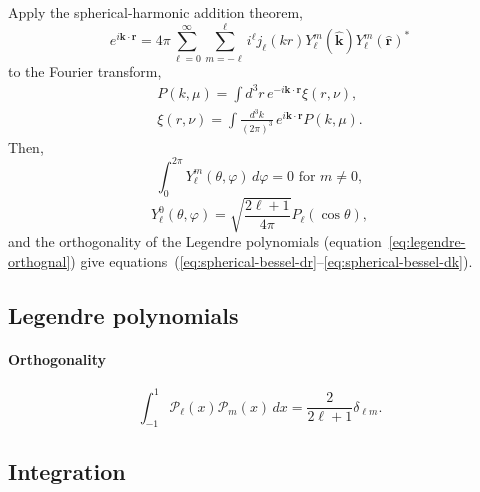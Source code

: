 \documentclass[a4paper,11pt, fleqn]{article}
\begin{document}
\vspace{5mm}

Apply the spherical-harmonic addition theorem,
%
\begin{equation}
  e^{i\bm{k}\cdot\bm{r}} = 4\pi \sum_{\ell=0}^\infty \sum_{m=-\ell}^\ell
  i^\ell j_\ell(kr) Y_\ell^m(\hat{\bm{k}}) Y_\ell^m(\hat{\bm{r}})^*
\end{equation}
%
to the Fourier transform,
%
\begin{align}
  P(k, \mu) = \int \!\! d^3 r \, e^{-i\bm{k}\cdot\bm{r}} \xi(r, \nu),\\
  \xi(r, \nu) = \int \!\! \frac{d^3 k}{(2\pi)^3} \, e^{i\bm{k}\cdot\bm{r}} P(k, \mu).
\end{align}
%
Then,
%
\begin{equation}
  \int_0^{2\pi} \! Y_\ell^m(\theta, \varphi) \, d \varphi = 0
  \mbox{ for $m \neq 0$},
\end{equation}
%
\begin{equation}
  Y_\ell^0(\theta, \varphi) = \sqrt{\frac{2\ell + 1}{4\pi}} P_\ell(\cos\theta),
\end{equation}
%
and the orthogonality of the Legendre polynomials
(equation~\ref{eq:legendre-orthognal}) give
equations~(\ref{eq:spherical-bessel-dr}--\ref{eq:spherical-bessel-dk}).

\clearpage
\subsection{Legendre polynomials}
\label{sec:legendre}

\vspace{4mm}

\paragraph{Orthogonality}
  
\begin{equation}
  \label{eq:legendre-orthognal}
  \int_{-1}^1 \mathcal{P}_\ell(x) \mathcal{P}_m(x) \, dx =
    \frac{2}{2\ell + 1} \delta_{\ell m}.
\end{equation}

\clearpage
\subsection{Integration}
\label{sec:integration}

\vspace{5mm}
\end{document}
